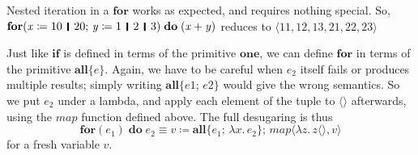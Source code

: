 \documentclass[acmsmall,review,dvipsnames]{acmart}
\newcommand{\Varid}[1]{\mathit{#1}}
\begin{document}
Nested iteration in a \ensuremath{\textbf{for}} works as expected, and requires nothing special.
So, \ensuremath{\textbf{for} (\Varid{x}\mathrel{\coloneqq}\mathrm{10}\hspace{1mm}\mathop{\rule[-0.3mm]{0.5mm}{2.5mm}}\hspace{1mm}\mathrm{20};\,\Varid{y}\mathrel{\coloneqq}\mathrm{1}\hspace{1mm}\mathop{\rule[-0.3mm]{0.5mm}{2.5mm}}\hspace{1mm}\mathrm{2}\hspace{1mm}\mathop{\rule[-0.3mm]{0.5mm}{2.5mm}}\hspace{1mm}\mathrm{3})\;\textbf{do}\;(\Varid{x}\mathbin{+}\Varid{y})} reduces to \ensuremath{\langle{}\mathrm{11},\mathrm{12},\mathrm{13},\mathrm{21},\mathrm{22},\mathrm{23}\rangle}

Just like \ensuremath{\textbf{if}} is defined in terms of the primitive \ensuremath{\textbf{one}}, we can define \ensuremath{\textbf{for}}
in terms of the primitive \ensuremath{\textbf{all}\{\Varid{e}\}}.
Again, we have to be careful when \ensuremath{\Varid{e}_{\mathrm{2}}} itself fails or produces multiple results;
simply writing \ensuremath{\textbf{all}\{\Varid{e1};\,\Varid{e2}\}} would give the wrong semantics. So we put \ensuremath{\Varid{e}_{\mathrm{2}}} under a lambda, and
apply each element of the tuple to \ensuremath{\langle\rangle} afterwards, using the \ensuremath{\Varid{map}} function defined above.
The full desugaring is thus
\[
\ensuremath{\textbf{for} (\Varid{e}_{\mathrm{1}})\;\textbf{do}\;\Varid{e}_{\mathrm{2}}} \equiv \ensuremath{\Varid{v}\mathrel{\coloneqq}\textbf{all}\{\Varid{e}_{\mathrm{1}};\,\lambda x.\,\Varid{e}_{\mathrm{2}}\};\,\Varid{map}\langle\lambda\Varid{z}.\,\Varid{z}\langle\rangle,\Varid{v}\rangle}
\]
for a fresh variable \ensuremath{\Varid{v}}.
\end{document}

